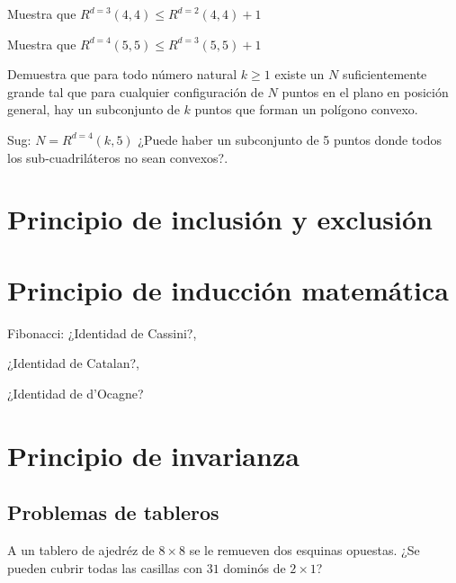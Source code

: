 \begin{problema}
Muestra que $R^{d=3}(4,4)\leq R^{d=2}(4,4)+1$
\end{problema}
\vspace{2cm}

\begin{problema}
Muestra que $R^{d=4}(5,5)\leq R^{d=3}(5,5)+1$
\end{problema}
\vspace{2cm}

\begin{problema}
Demuestra que para todo número natural $k\geq 1$ existe un $N$ suficientemente grande tal que para cualquier configuración de $N$ puntos en el plano en posición general, hay un subconjunto de $k$ puntos que forman un polígono convexo.
\end{problema}
Sug: $N=R^{d=4}(k,5)$ ¿Puede haber un subconjunto de 5 puntos donde todos los sub-cuadriláteros no sean convexos?.
\vspace{2cm}

\newpage

\section{Principio de inclusión y exclusión}

\section{Principio de inducción matemática}

\begin{ejercicio} Fibonacci:
¿Identidad de Cassini?, 

¿Identidad de Catalan?, 

¿Identidad de d'Ocagne?
\end{ejercicio}



\section{Principio de invarianza}

\subsection*{Problemas de tableros}

\begin{problema}
A un tablero de ajedréz de $8\times 8$ se le remueven dos esquinas opuestas. ¿Se pueden cubrir todas las casillas con $31$ dominós de $2\times 1$?
\end{problema}

